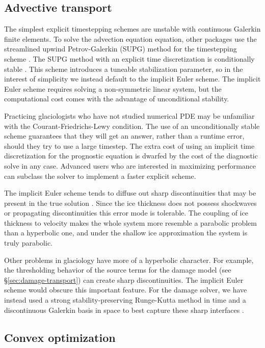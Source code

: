 \documentclass{article}
\theoremstyle{definition}
\theoremstyle{plain}
\begin{document}
\subsection{Advective transport} \label{sec:prognostic-model}

The simplest explicit timestepping schemes are unstable with continuous Galerkin finite elements.
To solve the advection equation equation, other packages use the streamlined upwind Petrov-Galerkin (SUPG) method for the timestepping scheme \citep{brinkerhoff2013data, larour2012continental}.
The SUPG method with an explicit time discretization is conditionally stable \citep{donea2003finite}.
This scheme introduces a tuneable stabilization parameter, so in the interest of simplicity we instead default to the implicit Euler scheme.
The implicit Euler scheme requires solving a non-symmetric linear system, but the computational cost comes with the advantage of unconditional stability.

Practicing glaciologists who have not studied numerical PDE may be unfamiliar with the Courant-Friedrichs-Lewy condition.
The use of an unconditionally stable scheme guarantees that they will get an answer, rather than a runtime error, should they try to use a large timestep.
The extra cost of using an implicit time discretization for the prognostic equation is dwarfed by the cost of the diagnostic solve in any case.
Advanced users who are interested in maximizing performance can subclass the solver to implement a faster explicit scheme.

The implicit Euler scheme tends to diffuse out sharp discontinuities that may be present in the true solution \citep{donea2003finite}.
Since the ice thickness does not possess shockwaves or propagating discontinuities this error mode is tolerable.
The coupling of ice thickness to velocity makes the whole system more resemble a parabolic problem than a hyperbolic one, and under the shallow ice approximation the system is truly parabolic.

Other problems in glaciology have more of a hyperbolic character.
For example, the thresholding behavior of the source terms for the damage model (see \S\ref{sec:damage-transport}) can create sharp discontinuities.
The implicit Euler scheme would obscure this important feature.
For the damage solver, we have instead used a strong stability-preserving Runge-Kutta method in time and a discontinuous Galerkin basis in space to best capture these sharp interfaces \citep{shu1988efficient}.


\subsection{Convex optimization}
\end{document}
